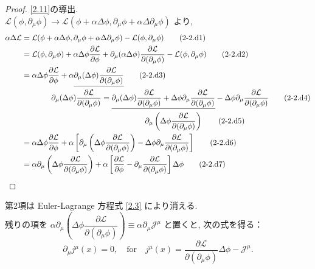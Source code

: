 \documentclass[a4paper,12pt]{article}
\begin{document}
\begin{proof}\eqref{2.11}の導出.\\
$\mathcal{L}(\phi, \partial_\mu \phi) \to \mathcal{L}(\phi + \alpha\Delta\phi, \partial_\mu \phi + \alpha\Delta\partial_\mu \phi)$ より,
\begin{align*}
    \alpha\Delta\mathcal{L} &= \mathcal{L}(\phi + \alpha\Delta\phi, \partial_\mu \phi + \alpha\Delta\partial_\mu \phi) - \mathcal{L}(\phi, \partial_\mu \phi) \tag{2-2.d1}\\
    &= \mathcal{L}(\phi, \partial_\mu \phi) + \alpha\Delta\phi\frac{\partial \mathcal{L}}{\partial \phi} + \partial_\mu (\alpha\Delta\phi) \frac{\partial \mathcal{L}}{\partial (\partial_\mu \phi)} - \mathcal{L}(\phi, \partial_\mu \phi) \tag{2-2.d2}\\
    &= \alpha\Delta\phi\frac{\partial \mathcal{L}}{\partial \phi} + \alpha\underline{\partial_\mu (\Delta\phi) \frac{\partial \mathcal{L}}{\partial (\partial_\mu \phi)}} \tag{2-2.d3}\\
    &\quad\hspace{1cm} \partial_\mu (\Delta\phi) \frac{\partial \mathcal{L}}{\partial (\partial_\mu \phi)} = \underline{\partial_\mu (\Delta\phi)\frac{\partial \mathcal{L}}{\partial(\partial_\mu \phi)} + \Delta\phi\partial_\mu \frac{\partial \mathcal{L}}{\partial(\partial_\mu \phi)}} - \Delta\phi\partial_\mu \frac{\partial \mathcal{L}}{\partial(\partial_\mu \phi)} \tag{2-2.d4}\\
    &\quad\hspace{5.3cm} \partial_\mu \left( \Delta\phi \frac{\partial \mathcal{L}}{\partial(\partial_\mu \phi)}\right) \tag{2-2.d5}\\
    &= \alpha\Delta\phi\frac{\partial \mathcal{L}}{\partial \phi} + \alpha\left[ \partial_\mu \left( \Delta\phi \frac{\partial \mathcal{L}}{\partial(\partial_\mu \phi)}\right) - \Delta\phi\partial_\mu \frac{\partial \mathcal{L}}{\partial(\partial_\mu \phi)} \right] \tag{2-2.d6}\\
    &= \alpha \partial_\mu \left( \Delta\phi \frac{\partial \mathcal{L}}{\partial(\partial_\mu \phi)}\right) + \alpha\left[ \frac{\partial \mathcal{L}}{\partial \phi} - \partial_\mu \frac{\partial \mathcal{L}}{\partial(\partial_\mu \phi)} \right]\Delta\phi \tag{2-2.d7}
\end{align*}
\end{proof}

\color{black}

第2項は Euler-Lagrange 方程式 \eqref{2.3} により消える.\\
残りの項を $\alpha \partial_\mu \left( \Delta\phi \dfrac{\partial \mathcal{L}}{\partial(\partial_\mu \phi)}\right) \equiv \alpha \partial_\mu \mathcal{J}^\mu$ と置くと, 次の式を得る：
\begin{equation}\label{2.12}
\partial_\mu j^\mu(x) = 0, \quad \text{for} \quad j^\mu(x) = \frac{\partial \mathcal{L}}{\partial(\partial_\mu \phi)} \Delta \phi - \mathcal{J}^\mu.
\tag{2.12}
\end{equation}
\end{document}
